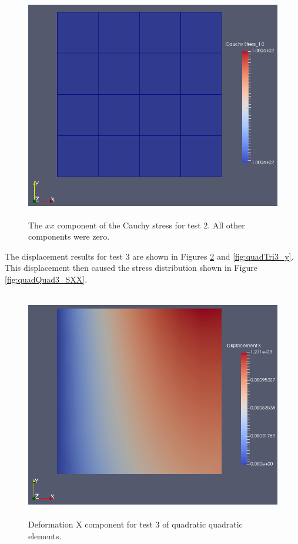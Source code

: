 \documentclass[a4paper, 12pt]{article}
\begin{document}
\begin{figure}[H]
  \centering
  \includegraphics[width=13cm, height=10cm]{Qquad_4_t2_Sxx}
  \caption{The $xx$ component of the Cauchy stress for test 2.
            All other components were zero.}
  \label{fig:quadQuad2_SXX}
\end{figure}

The displacement results for test 3 are shown in 
Figures \ref{fig:quadQuad3_x} and \ref{fig:quadTri3_y}.
This displacement then caused the stress distribution 
shown in Figure \ref{fig:quadQuad3_SXX}.

\begin{figure}[H]
  \centering
  \includegraphics[width=13cm, height=10cm]{Qquad_4_t3_disp_X}
  \caption{Deformation X component for test 3 of quadratic
            quadratic elements.}
  \label{fig:quadQuad3_x}
\end{figure}
\end{document}
